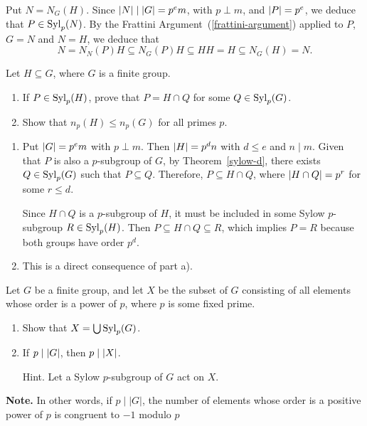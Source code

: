 \begin{solution} Put $N=N_G(H)$. Since $\left\vert{N}\right\vert\mid\left\vert{G}\right\vert=p^em$, with $p\perp m$, and $\left\vert{P}\right\vert=p^e$, we deduce that $P\in{\rm Syl}_p(N)$. By the Frattini Argument~(\ref{frattini-argument}) applied to $P$, $G=N$ and $N=H$, we deduce that
$$
    N=N_N(P)H\subseteq N_G(P)H\subseteq HH=H\subseteq N_G(H)=N.
$$
 \end{solution}

\begin{probl}\label{problem-1.C.2}
    Let $H \subseteq G$, where $G$ is a finite group.
    \begin{enumerate}[\rm a)]
        \item If\/ $P\in{\rm Syl}_p(H)$, prove that $P=H\cap Q$ for some $Q\in {\rm Syl}_p(G)$.

        \item Show that $n_p(H) \le n_p(G)$ for all primes $p$.
    \end{enumerate}
\end{probl}

\begin{solution}
\begin{enumerate}[\rm a)]
    \item Put $\left\vert{G}\right\vert=p^em$ with $p\perp m$. Then $\left\vert{H}\right\vert=p^dn$ with $d\le e$ and $n\mid m$.
    Given that $P$ is also a $p$-subgroup of $G$, by Theorem~\ref{sylow-d}, there exists $Q\in{\rm Syl}_p(G)$ such that $P\subseteq Q$. Therefore, $P\subseteq H\cap Q$, where $\left\vert{H\cap Q}\right\vert=p^r$ for some $r\le d$.

    Since $H\cap Q$ is a $p$-subgroup of $H$, it must be included in some Sylow $p$-subgroup $R\in{\rm Syl}_p(H)$. Then $P\subseteq H\cap Q\subseteq R$, which implies $P=R$ because both groups have order $p^d$.
    
    \item This is a direct consequence of part a).
\end{enumerate}
\end{solution}

\begin{probl}\label{problem-1.C.3}
    Let\/ $G$ be a finite group, and let $X$ be the subset of\/ $G$ consisting of all elements whose order is a power of\/ $p$, where $p$ is some fixed prime.
    \begin{enumerate}[\rm a)]
        \item Show that $X = \bigcup{\rm Syl}_p(G)$.
        \item If\/ $p\mid\left\vert{G}\right\vert$, then $p\mid\left\vert{X}\right\vert$.
        
        \textrm{\rm Hint. Let a Sylow $p$-subgroup of $G$ act on $X$.}
    \end{enumerate}

    \textrm{\rm\textbf{Note.} In other words, if $p\mid|G|$, the number of elements whose order is a positive power of $p$ is congruent to $-1$ modulo $p$}
\end{probl}

